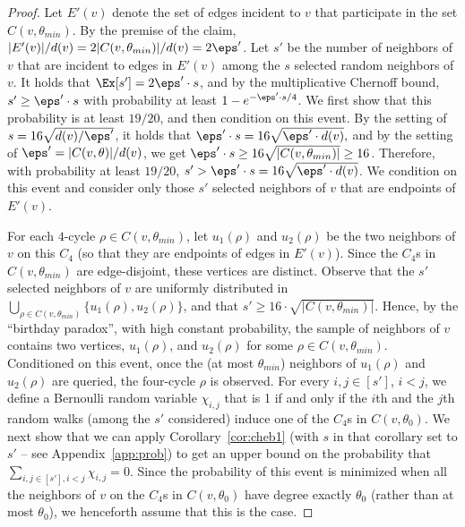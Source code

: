 \begin{proof}
Let $E'(v)$ denote the set of edges incident to $v$ that participate in the set $C(v,\theta_{min})$. By the premise of the claim, $|E'(v)|/d(v)= 2|C(v,\theta_{min})|/d(v)= 2\eps'$. Let $s'$ be the number of neighbors  of $v$ that are incident to edges in $E'(v)$ among the $s$ selected random neighbors of $v$.
It holds that $\Ex[s']=2\eps' \cdot s$, and  by the multiplicative Chernoff bound, $s' \geq \eps' \cdot s$
with probability at least $1-e^{-\eps'\cdot s/4}$. 
We first show that this probability is at least $19/20$, and then condition on this event.
By the setting of $s=16\sqrt{d(v)/\eps'}$, it holds that $  \eps'\cdot s = 16\sqrt{\eps'\cdot d(v)},$ and by the setting of  $\eps'=|C(v,\theta)|/d(v)$, we get $\eps'\cdot s \geq 16\sqrt{|C(v, \theta_{min})|}\geq 16$. 
Therefore, with probability at least $19/20$, $s'>\eps'\cdot s= 16\sqrt{\eps' \cdot d(v)}$.
We condition on this event and consider only those $s'$ 
selected neighbors of $v$ that are endpoints of $E'(v)$.

For each $4$-cycle $\rho\in C(v,\theta_{min})$, let $u_1(\rho)$ and $u_2(\rho)$ be the two neighbors of $v$ on this $C_4$ (so that they are endpoints of edges in $E'(v)$). Since the $C_4$s in $C(v,\theta_{min})$ are edge-disjoint, these vertices are distinct. 
Observe that the $s'$ selected neighbors of $v$   are uniformly distributed in $\bigcup_{\rho\in C(v,\theta_{min})}\{u_1(\rho),u_2(\rho)\}$, and that $s' \geq 16\cdot\sqrt{|C(v,\theta_{min})|}$. Hence, by the ``birthday paradox'',  with high constant probability, the sample of neighbors of $v$ contains two vertices, $u_1(\rho)$, and $u_2(\rho)$
for some $\rho \in C(v,\theta_{min})$. 
Conditioned on this event, once the (at most $\theta_{min}$) neighbors of
$u_1(\rho)$ and $u_2(\rho)$ are queried, the four-cycle $\rho$ is observed.
\iffalse
For every $i,j \in [s']$, $i<j$, we define a Bernoulli random variable $\chi_{i,j}$ that is 1 if and only if the $i$th and the $j$th random walks (among the $s'$ considered) induce one of the $C_4$s in $C(v,\theta_0)$. We next show that we can apply Corollary~\ref{cor:cheb1} (with $s$ in that corollary set to $s'$ -- see Appendix~\ref{app:prob}) to get an upper bound on the probability that $\sum_{i,j \in [s'], i<j} \chi_{i,j} = 0$.
Since the probability of this event is minimized when all the neighbors of $v$ on the $C_4$s in $C(v,\theta_0)$ have degree exactly $\theta_0$ (rather than at most $\theta_0$), we henceforth assume that this is the case.


\end{proof}
